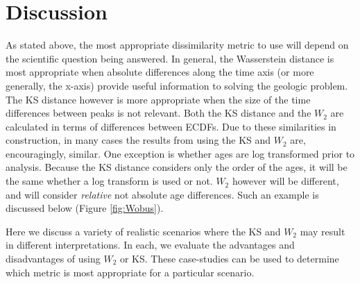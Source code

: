 \documentclass[gchron, manuscript]{copernicus}
\begin{document}

\section{Discussion}

As stated above, the most appropriate dissimilarity metric to use will depend on the scientific question being answered. In general, the Wasserstein distance is most appropriate when absolute differences along the time axis (or more generally, the x-axis) provide useful information to solving the geologic problem. The KS distance however is more appropriate when the size of the time differences between peaks is not relevant. Both the KS distance and the $W_2$ are calculated in terms of differences between ECDFs. Due to these similarities in construction, in many cases the results from using the KS and $W_2$ are, encouragingly, similar. One exception is whether ages are log transformed prior to analysis. Because the KS distance considers only the order of the ages, it will be the same whether a log transform is used or not. $W_2$ however will be different, and will consider \textit{relative} not absolute age differences.  Such an example is discussed below (Figure \ref{fig:Wobus}). 

Here we discuss a variety of realistic scenarios where the KS and $W_2$ may result in different interpretations. In each, we evaluate the advantages and disadvantages of using $W_2$ or KS. These case-studies can be used to determine which metric is most appropriate for a particular scenario. 
\end{document}
